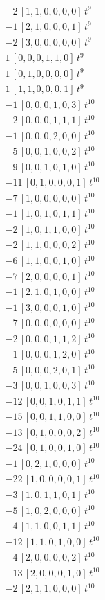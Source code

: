 \begin{align*}
-2\,[1,1,0,0,0,0]\,t^{9} \\
-1\,[2,1,0,0,0,1]\,t^{9} \\
-2\,[3,0,0,0,0,0]\,t^{9} \\
1\,[0,0,0,1,1,0]\,t^{9} \\
1\,[0,1,0,0,0,0]\,t^{9} \\
1\,[1,1,0,0,0,1]\,t^{9} \\
-1\,[0,0,0,1,0,3]\,t^{10} \\
-2\,[0,0,0,1,1,1]\,t^{10} \\
-1\,[0,0,0,2,0,0]\,t^{10} \\
-5\,[0,0,1,0,0,2]\,t^{10} \\
-9\,[0,0,1,0,1,0]\,t^{10} \\
-11\,[0,1,0,0,0,1]\,t^{10} \\
-7\,[1,0,0,0,0,0]\,t^{10} \\
-1\,[1,0,1,0,1,1]\,t^{10} \\
-2\,[1,0,1,1,0,0]\,t^{10} \\
-2\,[1,1,0,0,0,2]\,t^{10} \\
-6\,[1,1,0,0,1,0]\,t^{10} \\
-7\,[2,0,0,0,0,1]\,t^{10} \\
-1\,[2,1,0,1,0,0]\,t^{10} \\
-1\,[3,0,0,0,1,0]\,t^{10} \\
-7\,[0,0,0,0,0,0]\,t^{10} \\
-2\,[0,0,0,1,1,2]\,t^{10} \\
-1\,[0,0,0,1,2,0]\,t^{10} \\
-5\,[0,0,0,2,0,1]\,t^{10} \\
-3\,[0,0,1,0,0,3]\,t^{10} \\
-12\,[0,0,1,0,1,1]\,t^{10} \\
-15\,[0,0,1,1,0,0]\,t^{10} \\
-13\,[0,1,0,0,0,2]\,t^{10} \\
-24\,[0,1,0,0,1,0]\,t^{10} \\
-1\,[0,2,1,0,0,0]\,t^{10} \\
-22\,[1,0,0,0,0,1]\,t^{10} \\
-3\,[1,0,1,1,0,1]\,t^{10} \\
-5\,[1,0,2,0,0,0]\,t^{10} \\
-4\,[1,1,0,0,1,1]\,t^{10} \\
-12\,[1,1,0,1,0,0]\,t^{10} \\
-4\,[2,0,0,0,0,2]\,t^{10} \\
-13\,[2,0,0,0,1,0]\,t^{10} \\
-2\,[2,1,1,0,0,0]\,t^{10} \\

\end{align*}
